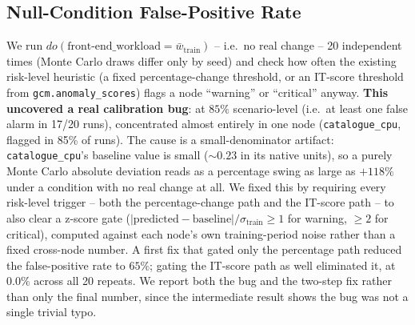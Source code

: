 \documentclass[journal, 10pt]{IEEEtran}
\begin{document}
\subsection{Null-Condition False-Positive Rate}
\label{sec:null-fp}
We run $do(\text{front-end\_workload} = \bar{w}_{\text{train}})$ -- i.e.\ no real change -- 20 independent times (Monte Carlo draws differ only by seed) and check how often the existing risk-level heuristic (a fixed percentage-change threshold, or an IT-score threshold from \texttt{gcm.anomaly\_scores}) flags a node ``warning'' or ``critical'' anyway. \textbf{This uncovered a real calibration bug}: at $85\%$ scenario-level (i.e.\ at least one false alarm in 17/20 runs), concentrated almost entirely in one node (\texttt{catalogue\_cpu}, flagged in 85\% of runs). The cause is a small-denominator artifact: \texttt{catalogue\_cpu}'s baseline value is small (${\sim}0.23$ in its native units), so a purely Monte Carlo absolute deviation reads as a percentage swing as large as $+118\%$ under a condition with no real change at all. We fixed this by requiring every risk-level trigger -- both the percentage-change path and the IT-score path -- to also clear a z-score gate ($|{\text{predicted}-\text{baseline}}| / \sigma_{\text{train}} \geq 1$ for warning, $\geq 2$ for critical), computed against each node's own training-period noise rather than a fixed cross-node number. A first fix that gated only the percentage path reduced the false-positive rate to $65\%$; gating the IT-score path as well eliminated it, at $0.0\%$ across all 20 repeats. We report both the bug and the two-step fix rather than only the final number, since the intermediate result shows the bug was not a single trivial typo.
\end{document}
